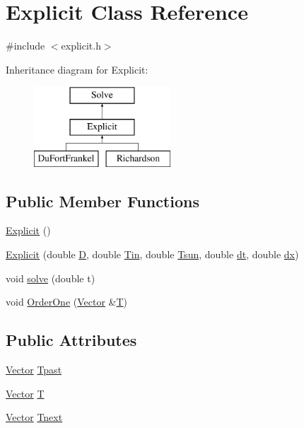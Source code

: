\hypertarget{class_explicit}{}\section{Explicit Class Reference}
\label{class_explicit}


{\ttfamily \#include $<$explicit.\+h$>$}

Inheritance diagram for Explicit\+:\begin{figure}[H]
\begin{center}
\leavevmode
\includegraphics[height=3.000000cm]{class_explicit}
\end{center}
\end{figure}
\subsection*{Public Member Functions}
\begin{DoxyCompactItemize}
\item 
\hyperlink{class_explicit_a7534f9c32911234d06bec7f47ad7596e}{Explicit} ()
\item 
\hyperlink{class_explicit_ab5b890fae2ea8a91c95e9a15f552f36a}{Explicit} (double \hyperlink{class_solve_ab6b73352e9bca73bad1b133fc84f008c}{D}, double \hyperlink{class_solve_a324c747af91a26a206d7772853b8655e}{Tin}, double \hyperlink{class_solve_a7145536b49fb1ac4d2f36f800d118616}{Tsun}, double \hyperlink{class_solve_ac1befb9c006f895fb0517e19c412ca57}{dt}, double \hyperlink{class_solve_a21b9b8118f508e079f066d2ce2816dd1}{dx})
\item 
void \hyperlink{class_explicit_ac99aa17bfd95f66b33e5c0ecf0e53785}{solve} (double t)
\item 
void \hyperlink{class_explicit_a6069720017eb2bb0d989b2557c162c97}{Order\+One} (\hyperlink{class_vector}{Vector} \&\hyperlink{class_explicit_ae53d46a9f687aa478f8641a86f9e8555}{T})
\end{DoxyCompactItemize}
\subsection*{Public Attributes}
\begin{DoxyCompactItemize}
\item 
\hyperlink{class_vector}{Vector} \hyperlink{class_explicit_a901bd7294da6e25d9b3c8851653c37dc}{Tpast}
\item 
\hyperlink{class_vector}{Vector} \hyperlink{class_explicit_ae53d46a9f687aa478f8641a86f9e8555}{T}
\item 
\hyperlink{class_vector}{Vector} \hyperlink{class_explicit_ac8dbd124708dde54d99dfe2fc9b4851a}{Tnext}
\end{DoxyCompactItemize}


